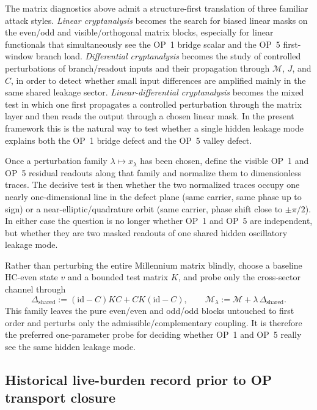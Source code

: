 \begin{description}[leftmargin=2.2em, labelindent=0pt, itemsep=0.5em]
 \item[Cryptanalytic translation tool.] The matrix diagnostics above admit a structure-first translation of three familiar attack styles. \emph{Linear cryptanalysis} becomes the search for biased linear masks on the even/odd and visible/orthogonal matrix blocks, especially for linear functionals that simultaneously see the OP~1 bridge scalar and the OP~5 first-window branch load. \emph{Differential cryptanalysis} becomes the study of controlled perturbations of branch/readout inputs and their propagation through \(\mathcal M\), \(J\), and \(C\), in order to detect whether small input differences are amplified mainly in the same shared leakage sector. \emph{Linear-differential cryptanalysis} becomes the mixed test in which one first propagates a controlled perturbation through the matrix layer and then reads the output through a chosen linear mask. In the present framework this is the natural way to test whether a single hidden leakage mode explains both the OP~1 bridge defect and the OP~5 valley defect.
 \item[Shared phase-coupling tool.] Once a perturbation family \(\lambda\mapsto x_\lambda\) has been chosen, define the visible OP~1 and OP~5 residual readouts along that family and normalize them to dimensionless traces. The decisive test is then whether the two normalized traces occupy one nearly one-dimensional line in the defect plane (same carrier, same phase up to sign) or a near-elliptic/quadrature orbit (same carrier, phase shift close to \(\pm\pi/2\)). In either case the question is no longer whether OP~1 and OP~5 are independent, but whether they are two masked readouts of one shared hidden oscillatory leakage mode.
 \item[Shared leakage probe-family tool.] Rather than perturbing the entire Millennium matrix blindly, choose a baseline HC-even state \(v\) and a bounded test matrix \(K\), and probe only the cross-sector channel through
 \[
 \Delta_{\mathrm{shared}}:= (\mathrm{id}-C)KC + CK(\mathrm{id}-C),
 \qquad
 \mathcal M_\lambda := \mathcal M + \lambda\,\Delta_{\mathrm{shared}}.
 \]
 This family leaves the pure even/even and odd/odd blocks untouched to first order and perturbs only the admissible/complementary coupling. It is therefore the preferred one-parameter probe for deciding whether OP~1 and OP~5 really see the same hidden leakage mode.
\end{description}

\subsection*{Historical live-burden record prior to OP transport closure}
